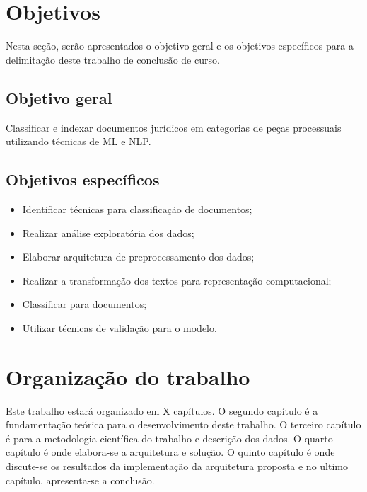 \section{Objetivos}
Nesta seção, serão apresentados o objetivo geral e os objetivos específicos para a delimitação deste trabalho de conclusão de curso.

\subsection{Objetivo geral}

Classificar e indexar documentos jurídicos em categorias de peças processuais utilizando técnicas de ML e NLP.

\subsection{Objetivos específicos}    

\begin{itemize}
  \item Identificar técnicas para classificação de documentos;
  \item Realizar análise exploratória dos dados;
  \item Elaborar arquitetura de preprocessamento dos dados;
  \item Realizar a transformação dos textos para representação computacional;
  \item Classificar para documentos;
  \item Utilizar técnicas de validação para o modelo.
\end{itemize}

\section{Organização do trabalho}
	Este trabalho estará organizado em X capítulos. O segundo capítulo é a fundamentação teórica para o desenvolvimento deste trabalho. O terceiro capítulo é para a metodologia científica do trabalho e descrição dos dados. O quarto capítulo é onde elabora-se a arquitetura e solução. O quinto capítulo é onde discute-se os resultados da implementação da arquitetura proposta e no ultimo capítulo, apresenta-se a conclusão.